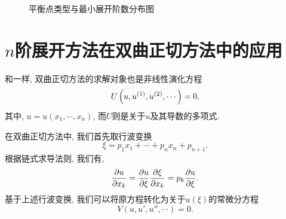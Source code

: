 \begin{figure}[htbp]
\centering
{}
\caption{平衡点类型与最小展开阶数分布图}
\end{figure}

\section{$n$阶展开方法在双曲正切方法中的应用}\label{ch4sec5}
和一样, 双曲正切方法的求解对象也是非线性演化方程
\begin{equation}
    U\left(u,u^{(1)},u^{(2)},\cdots\right)=0,
\end{equation}
其中, $u=u(x_1,\cdots,x_n)$, 而$U$则是关于$u$及其导数的多项式. 

在双曲正切方法中, 我们首先取行波变换 
\begin{equation}
    \xi = p_1 x_1 +\cdots + p_n x_n + p_{n+1}.  \label{tanh-tw}
\end{equation}
根据链式求导法则, 我们有,
\begin{equation}
    \frac{\partial u}{\partial x_k}=\frac{\partial u}{\partial \xi}\frac{\partial \xi}{\partial x_k}=p_k\frac{\partial u}{\partial \xi}.
\end{equation}
基于上述行波变换, 我们可以将原方程转化为关于$u(\xi)$的常微分方程
\begin{equation}
    V(u,u',u'',\cdots)=0. \label{odeq}
\end{equation}

